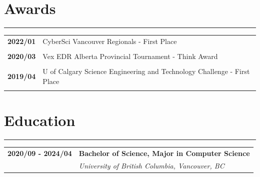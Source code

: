 \documentclass[letterpaper]{article}
\newcommand{\sect}[1]{\section*{#1}
                        {\color{cyan}
                        \rule{\textwidth}{1pt}
                        \vspace{-1ex}}}
\begin{document}
    \sect{Awards}

        \begin{tabular}{p{} p{}}
            \textbf{2022/01} & CyberSci Vancouver Regionals - First Place \\
            \\
            \textbf{2020/03} & Vex EDR Alberta Provincial Tournament - Think Award \\
            \\
            \textbf{2019/04} & U of Calgary Science Engineering and Technology Challenge - First Place \\
            \\
        \end{tabular}

    \sect{Education}

        \begin{tabular}{p{} p{}}
            \textbf{2020/09 - 2024/04} & \large\textbf{Bachelor of Science, Major in Computer Science} \\
            & \emph{University of British Columbia, Vancouver, BC} \\
        \end{tabular}
\end{document}
